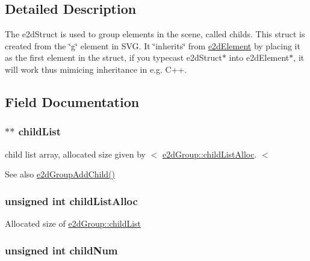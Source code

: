 \subsection{Detailed Description}
The e2d\-Struct is used to group elements in the scene, called childs. This struct is created from the \char`\"{}g\char`\"{} element in S\-V\-G. It \char`\"{}inherits\char`\"{} from \hyperlink{structe2d_element}{e2d\-Element} by placing it as the first element in the struct, if you typecast e2d\-Struct$\ast$ into e2d\-Element$\ast$, it will work thus mimicing inheritance in e.\-g. C++. 

\subsection{Field Documentation}
\hypertarget{structe2d_group_a55f6dde874716dc99dcd270fc0999a01}{
\subsubsection[{child\-List}]{$\ast$$\ast$ {\bf child\-List}}}\label{structe2d_group_a55f6dde874716dc99dcd270fc0999a01}
child list array, allocated size given by $<$ \hyperlink{structe2d_group_a9c89d7cf35b835ef1917855c78a79cc5}{e2d\-Group\-::child\-List\-Alloc}. $<$ \begin{DoxySeeAlso}{See also}
\hyperlink{group__e2d_group_ga6ae76730f78ad731621e9286a3980b8a}{e2d\-Group\-Add\-Child()} 
\end{DoxySeeAlso}
\hypertarget{structe2d_group_a9c89d7cf35b835ef1917855c78a79cc5}{
\subsubsection[{child\-List\-Alloc}]{\setlength{\rightskip}{0pt plus 5cm}unsigned int {\bf child\-List\-Alloc}}}\label{structe2d_group_a9c89d7cf35b835ef1917855c78a79cc5}
Allocated size of \hyperlink{structe2d_group_a55f6dde874716dc99dcd270fc0999a01}{e2d\-Group\-::child\-List} \hypertarget{structe2d_group_a0af3697c2c9df6ed0ddd340cded35d65}{
\subsubsection[{child\-Num}]{\setlength{\rightskip}{0pt plus 5cm}unsigned int {\bf child\-Num}}}\label{structe2d_group_a0af3697c2c9df6ed0ddd340cded35d65}
